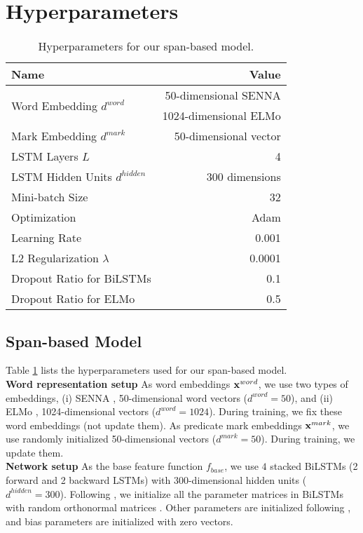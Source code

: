 \documentclass[11pt,a4paper]{article}
\begin{document}
\section{Hyperparameters}
\label{sec:hparam}
\begin{table}[H]
  \centering
  {\small
  \begin{tabular}{lr} \toprule
    Name & Value \\ \hline
    \multirow{2}{*}{Word Embedding $d^{word}$}
    & 50-dimensional SENNA \\
    & 1024-dimensional ELMo \\
    Mark Embedding $d^{mark}$ & 50-dimensional vector \\
    LSTM Layers $L$ & 4 \\
    LSTM Hidden Units $d^{hidden}$ & 300 dimensions \\
    Mini-batch Size & 32 \\
    Optimization & Adam \\
    Learning Rate & 0.001 \\
    L2 Regularization $\lambda$ & 0.0001 \\
    Dropout Ratio for BiLSTMs & 0.1 \\ 
    Dropout Ratio for ELMo & 0.5 \\ \toprule
  \end{tabular}
  }
  \caption{\label{tab:hyperparam} Hyperparameters for our span-based model.}
\end{table}

\subsection{Span-based Model}
Table \ref{tab:hyperparam} lists the hyperparameters used for our span-based model.\\

\vspace{-0.3cm}
\noindent
{\bf Word representation setup} \hspace{0.2cm} As word embeddings ${\bf x}^{word}$, we use two types of embeddings, (i) SENNA \cite{collobert:11}, 50-dimensional word vectors ($d^{word} = 50$), and (ii) ELMo \cite{peters:18}, 1024-dimensional vectors ($d^{word} = 1024$).
During training, we fix these word embeddings (not update them).
As predicate mark embeddings ${\bf x}^{mark}$, we use randomly initialized 50-dimensional vectors ($d^{mark} = 50$).
During training, we update them.\\

\vspace{-0.3cm}
\noindent
{\bf Network setup} \hspace{0.2cm} As the base feature function $f_{base}$, we use $4$ stacked BiLSTMs (2 forward and 2 backward LSTMs) with 300-dimensional hidden units ($d^{hidden} = 300$).
Following , we initialize all the parameter matrices in BiLSTMs with random orthonormal matrices \cite{saxe:13}.
Other parameters are initialized following , and bias parameters are initialized with zero vectors.
\end{document}
